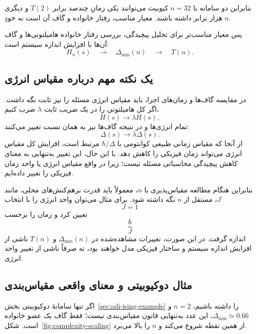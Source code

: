 بنابراین دو سامانه با $n=32$ کیوبیت می‌توانند یکی زمانِ چندصد برابر $T(2)$ و دیگری هزار برابر داشته باشند.
معیار مناسب، رفتار خانواده و گاف آن است نه خودِ $n$.

پس معیار مناسب‌تر برای تحلیل پیچیدگی، بررسی رفتار خانواده هامیلتونی‌ها و گاف آن‌ها با افزایش اندازه سیستم است:
\begin{equation}
	H_n(s)
	\quad\longrightarrow\quad
	\Delta_{\min}(n)
	\quad\longrightarrow\quad
	T(n).
\end{equation}

\subsection{یک نکته مهم درباره مقیاس انرژی}

در مقایسه گاف‌ها و زمان‌های اجرا، باید مقیاس انرژی مسئله را نیز ثابت نگه داشت. اگر کل هامیلتونی را در یک ضریب ثابت $\lambda$ ضرب کنیم،
\begin{equation}
	H(s)\rightarrow\lambda H(s),
\end{equation}
تمام انرژی‌ها و در نتیجه گاف‌ها نیز به همان نسبت تغییر می‌کنند:
\begin{equation}
	\Delta(s)\rightarrow\lambda\Delta(s).
\end{equation}
از آنجا که مقیاس زمانی طبیعی کوانتومی با $\hbar/\Delta$ مرتبط است، افزایش کل مقیاس انرژی می‌تواند زمان فیزیکی را کاهش دهد. با این حال، این تغییر به‌تنهایی به معنای کاهش پیچیدگی محاسباتی مسئله نیست؛ زیرا در واقع مقیاس انرژی یا واحد زمان فیزیکی را تغییر داده‌ایم.

بنابراین هنگام مطالعه مقیاس‌پذیری با $n$، معمولاً باید قدرت برهم‌کنش‌های محلی، مانند $J$، مستقل از $n$ نگه داشته شود. برای مثال می‌توان واحد انرژی را با انتخاب
\begin{equation}
	J=1
\end{equation}
تعیین کرد و زمان را برحسب
\begin{equation}
	\frac{\hbar}{J}
\end{equation}
اندازه گرفت. در این صورت، تغییرات مشاهده‌شده در $\Delta_{\min}(n)$ و $T(n)$ ناشی از افزایش اندازه سیستم و ساختار
فیزیکی مدل خواهند بود، نه صرفاً ناشی از تغییر واحد انرژی.

\subsection{مثال دوکیوبیتی و معنای واقعی مقیاس‌بندی}

اگر تنها سامانهٔ دوکیوبیتی بخش~\ref{sec:adi-ising-example} را داشته باشیم،
$n=2$ و $\Delta_{\min}\simeq0.66$،
این عدد به‌تنهایی قانون مقیاس‌بندی نیست؛ فقط گاف یک عضو خانواده است.
شکل~\ref{fig:complexity-scaling} از همین نقطه شروع می‌کند و $n$ را بالا می‌برد.

